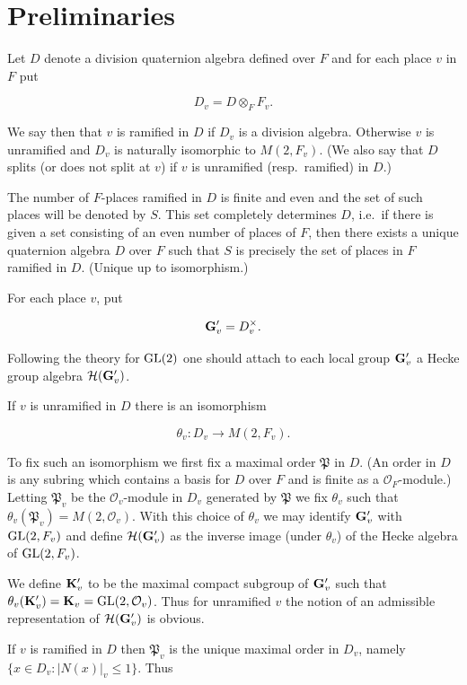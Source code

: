 \section{Preliminaries}\label{sec:10a}

Let $D$ denote a division quaternion algebra defined over $F$ and for each place $v$ in $F$ put

\[
D_v = D \otimes_F F_v.
\]

We say then that $v$ is ramified in $D$ if $D_v$ is a division algebra. Otherwise $v$ is unramified and $D_v$ is naturally isomorphic to $M(2, F_v)$. (We also say that $D$ splits (or does not split at $v$) if $v$ is unramified (resp.\ ramified) in $D$.)

The number of $F$-places ramified in $D$ is finite and even and the set of such places will be denoted by $S$. This set completely determines $D$, i.e.\ if there is given a set consisting of an even number of places of $F$, then there exists a unique quaternion algebra $D$ over $F$ such that $S$ is precisely the set of places in $F$ ramified in $D$. (Unique up to isomorphism.)

For each place $v$, put

\[
\mathbf{G}'_v = D_v^{\times}.
\]

Following the theory for $\operatorname{GL}(2)$ one should attach to each local group $\mathbf{G}'_v$ a Hecke group algebra $\mathcal{H}(\mathbf{G}'_v)$.

If $v$ is unramified in $D$ there is an isomorphism

\[
\theta_v: D_v \to M(2, F_v).
\]

To fix such an isomorphism we first fix a maximal order $\mathfrak{P}$ in $D$. (An order in $D$ is any subring which contains a basis for $D$ over $F$ and is finite as a $\mathcal{O}_F$-module.) Letting $\mathfrak{P}_v$ be the $\mathcal{O}_v$-module in $D_v$ generated by $\mathfrak{P}$ we fix $\theta_v$ such that $\theta_v(\mathfrak{P}_v) = M(2, \mathcal{O}_v)$. With this choice of $\theta_v$ we may identify $\mathbf{G}'_v$ with $\operatorname{GL}(2, F_v)$ and define $\mathcal{H}(\mathbf{G}'_v)$ as the inverse image (under $\theta_v$) of the Hecke algebra of $\operatorname{GL}(2, F_v)$.

We define $\mathbf{K}'_v$ to be the maximal compact subgroup of $\mathbf{G}'_v$ such that $\theta_v(\mathbf{K}'_v) = \mathbf{K}_v = \operatorname{GL}(2, \mathcal{O}_v)$. Thus for unramified $v$ the notion of an admissible representation of $\mathcal{H}(\mathbf{G}'_v)$ is obvious.

If $v$ is ramified in $D$ then $\mathfrak{P}_v$ is the unique maximal order in $D_v$, namely $\{x \in D_v: |N(x)|_v \leq 1\}$. Thus

